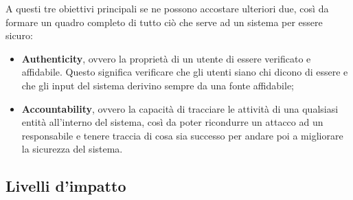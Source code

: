 \documentclass[14pt]{extarticle}
\begin{document}
A questi tre obiettivi principali se ne possono accostare ulteriori due, così da
formare un quadro completo di tutto ciò che serve ad un sistema per essere
sicuro:

\begin{itemize}
    \item \textbf{Authenticity}, ovvero la proprietà di un utente di essere
    verificato e affidabile. Questo significa verificare che gli utenti siano
    chi dicono di essere e che gli input del sistema derivino sempre da una
    fonte affidabile;
    \item \textbf{Accountability}, ovvero la capacità di tracciare le attività
    di una qualsiasi entità all'interno del sistema, così da poter ricondurre un
    attacco ad un responsabile e tenere traccia di cosa sia successo per andare
    poi a migliorare la sicurezza del sistema. 
\end{itemize}

\subsection{Livelli d'impatto}
\end{document}
